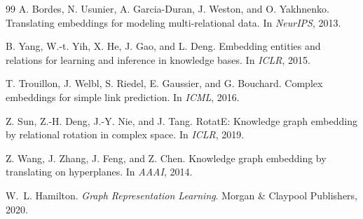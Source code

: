 \begin{notechapter}
\begin{thebibliography}{99}
A. Bordes, N. Usunier, A. Garcia-Duran, J. Weston, and O. Yakhnenko.
\newblock Translating embeddings for modeling multi-relational data.
\newblock In \emph{NeurIPS}, 2013.

B. Yang, W.-t. Yih, X. He, J. Gao, and L. Deng.
\newblock Embedding entities and relations for learning and inference in knowledge bases.
\newblock In \emph{ICLR}, 2015.

T. Trouillon, J. Welbl, S. Riedel, E. Gaussier, and G. Bouchard.
\newblock Complex embeddings for simple link prediction.
\newblock In \emph{ICML}, 2016.

Z. Sun, Z.-H. Deng, J.-Y. Nie, and J. Tang.
\newblock RotatE: Knowledge graph embedding by relational rotation in complex space.
\newblock In \emph{ICLR}, 2019.

Z. Wang, J. Zhang, J. Feng, and Z. Chen.
\newblock Knowledge graph embedding by translating on hyperplanes.
\newblock In \emph{AAAI}, 2014.

W.~L. Hamilton.
\newblock \emph{Graph Representation Learning}.
\newblock Morgan \& Claypool Publishers, 2020.

\end{thebibliography}
\end{notechapter}
